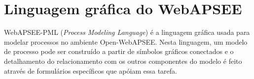 \apendice
\chapter{Linguagem gráfica do WebAPSEE}
\label{ApendiceA}

WebAPSEE-PML (\emph{Process Modeling Language}) é a linguagem gráfica usada para modelar processos no ambiente Open-WebAPSEE. Nesta linguagem, um modelo de processo pode ser construído a partir de símbolos gráficos conectados e o detalhamento do relacionamento com os outros componentes do modelo é feito através de formulários específicos que apóiam essa tarefa.
